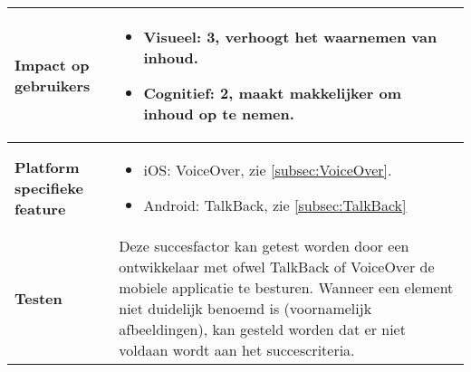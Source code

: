 \begin{table}[H]
\begin{tabular}{|l|p{12cm}|}
        \hline
        \textbf{Impact op gebruikers}        & 
        \begin{itemize}
            \item Visueel: 3, verhoogt het waarnemen van inhoud.
            \item Cognitief: 2, maakt makkelijker om inhoud op te nemen.             
        \end{itemize}                                                                                                                   \\ 
        \hline
        \textbf{Platform specifieke feature} & \begin{itemize}
            \item iOS: VoiceOver, zie \ref{subsec:VoiceOver}.
            \item Android: TalkBack, zie \ref{subsec:TalkBack}
        \end{itemize}                                                                                                                                                                       \\ 
        \hline
        \textbf{Testen}                      & Deze succesfactor kan getest worden door een ontwikkelaar met ofwel TalkBack of VoiceOver de mobiele applicatie te besturen. Wanneer een element niet duidelijk benoemd is (voornamelijk afbeeldingen), kan gesteld worden dat er niet voldaan wordt aan het succescriteria.                                                                                                                                                                                                                        \\
        \hline
    \end{tabular}
\end{table}




